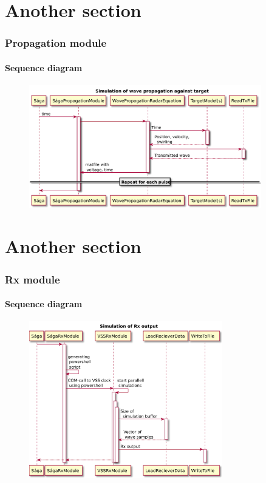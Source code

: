 \documentclass[11pt]{beamer} %
\begin{document}
\section{Another section}
\begin{frame}
 \frametitle{Propagation module}
 \framesubtitle{Sequence diagram}

\begin{figure}
\includegraphics[width=0.9\textwidth]{figures/UML/uml_SagaPropagationModule.pdf}
\end{figure}

\end{frame}


\section{Another section}
\begin{frame}
 \frametitle{Rx module}
 \framesubtitle{Sequence diagram}

\begin{figure}
\includegraphics[width=0.75\textwidth]{figures/UML/uml_SagaRx.pdf}
\end{figure}

\end{frame}
\end{document}
